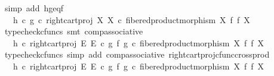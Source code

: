 \begin{isabellebody}
\ {\isacharparenleft}{\kern0pt}simp\ add{\isacharcolon}{\kern0pt}\ h{\isacharunderscore}{\kern0pt}g{\isacharunderscore}{\kern0pt}eq{\isacharunderscore}{\kern0pt}f{\isacharparenright}{\kern0pt}\isanewline
\ \ \ \ \isamarkupfalse%
\ \isamarkupfalse%
\ {\isachardoublequoteopen}{\isachardot}{\kern0pt}{\isachardot}{\kern0pt}{\isachardot}{\kern0pt}\ {\isacharequal}{\kern0pt}\ h\ {\isasymcirc}\isactrlsub c\ {\isacharparenleft}{\kern0pt}g\ {\isasymcirc}\isactrlsub c\ right{\isacharunderscore}{\kern0pt}cart{\isacharunderscore}{\kern0pt}proj\ X\ X{\isacharparenright}{\kern0pt}\ {\isasymcirc}\isactrlsub c\ fibered{\isacharunderscore}{\kern0pt}product{\isacharunderscore}{\kern0pt}morphism\ X\ f\ f\ X{\isachardoublequoteclose}\isanewline
\ \ \ \ \ \ \isamarkupfalse%
\ {\isacharparenleft}{\kern0pt}typecheck{\isacharunderscore}{\kern0pt}cfuncs{\isacharcomma}{\kern0pt}\ smt\ comp{\isacharunderscore}{\kern0pt}associative{}{\isacharparenright}{\kern0pt}\isanewline
\ \ \ \ \isamarkupfalse%
\ \isamarkupfalse%
\ {\isachardoublequoteopen}{\isachardot}{\kern0pt}{\isachardot}{\kern0pt}{\isachardot}{\kern0pt}\ {\isacharequal}{\kern0pt}\ h\ {\isasymcirc}\isactrlsub c\ right{\isacharunderscore}{\kern0pt}cart{\isacharunderscore}{\kern0pt}proj\ E\ E\ {\isasymcirc}\isactrlsub c\ {\isacharparenleft}{\kern0pt}g\ {\isasymtimes}\isactrlsub f\ g{\isacharparenright}{\kern0pt}\ {\isasymcirc}\isactrlsub c\ fibered{\isacharunderscore}{\kern0pt}product{\isacharunderscore}{\kern0pt}morphism\ X\ f\ f\ X{\isachardoublequoteclose}\isanewline
\ \ \ \ \ \ \isamarkupfalse%
\ {\isacharparenleft}{\kern0pt}typecheck{\isacharunderscore}{\kern0pt}cfuncs{\isacharcomma}{\kern0pt}\ simp\ add{\isacharcolon}{\kern0pt}\ comp{\isacharunderscore}{\kern0pt}associative{}\ right{\isacharunderscore}{\kern0pt}cart{\isacharunderscore}{\kern0pt}proj{\isacharunderscore}{\kern0pt}cfunc{\isacharunderscore}{\kern0pt}cross{\isacharunderscore}{\kern0pt}prod{\isacharparenright}{\kern0pt}\isanewline
\ \ \ \ \isamarkupfalse%
\ \isamarkupfalse%
\ {\isachardoublequoteopen}{\isachardot}{\kern0pt}{\isachardot}{\kern0pt}{\isachardot}{\kern0pt}\ {\isacharequal}{\kern0pt}\ {\isacharparenleft}{\kern0pt}h\ {\isasymcirc}\isactrlsub c\ right{\isacharunderscore}{\kern0pt}cart{\isacharunderscore}{\kern0pt}proj\ E\ E{\isacharparenright}{\kern0pt}\ {\isasymcirc}\isactrlsub c\ {\isacharparenleft}{\kern0pt}g\ {\isasymtimes}\isactrlsub f\ g{\isacharparenright}{\kern0pt}\ {\isasymcirc}\isactrlsub c\ fibered{\isacharunderscore}{\kern0pt}product{\isacharunderscore}{\kern0pt}morphism\ X\ f\ f\ X{\isachardoublequoteclose}\isanewline

\end{isabellebody}
